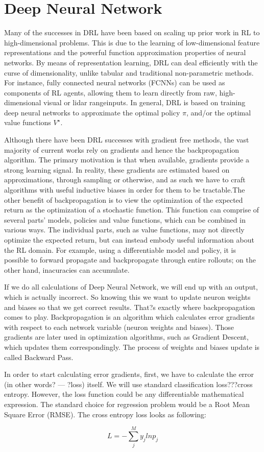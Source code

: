 \section{Deep Neural Network}

Many of the successes in DRL have been based on scaling up prior work in RL to high-dimensional problems. This is due to the learning of low-dimensional feature representations and the powerful function approximation properties of neural networks. By means of representation learning, DRL can deal efficiently with the curse of dimensionality, unlike tabular and traditional non-parametric methods. For instance, fully connected neural networks (FCNNs) can be used as components of RL agents, allowing them to learn directly from raw, high-dimensional visual or lidar rangeinputs. In general, DRL is based on training deep neural networks to approximate the optimal policy $\pi$, and/or the optimal value functions $V^\star$.

Although there have been DRL successes with gradient free methods, the vast majority of current works rely on gradients and hence the backpropagation algorithm. The primary motivation is that when available, gradients provide a strong learning signal. In reality, these gradients are estimated based on approximations, through sampling or otherwise, and as such we have to craft algorithms with useful inductive biases in order for them to be tractable.The other benefit of backpropagation is to view the optimization of the expected return as the optimization of a stochastic function. This function can comprise of several parts' models, policies and value functions, which can be combined in various ways. The individual parts, such as value functions, may not directly optimize the expected return, but can instead embody useful information about the RL domain. For example, using a differentiable model and policy, it is possible to forward propagate and backpropagate through entire rollouts; on the other hand, inacuracies can accumulate.

If we do all calculations of Deep Neural Network, we will end up with an output, which is actually incorrect. So knowing this we want to update neuron weights and biases so that we get correct results. That?s exactly where backpropagation comes to play. Backpropagation is an algorithm which calculates error gradients with respect to each network variable (neuron weights and biases). Those gradients are later used in optimization algorithms, such as Gradient Descent, which updates them correspondingly. The process of weights and biases update is called Backward Pass.

In order to start calculating error gradients, first, we have to calculate the error (in other words? --- ?loss) itself. We will use standard classification loss???cross entropy. However, the loss function could be any differentiable mathematical expression. The standard choice for regression problem would be a Root Mean Square Error (RMSE). The cross entropy loss looks as following:

\begin{equation} \label{eq:reward-func}
L = - \sum_j^M y_j ln p_j
\end{equation}

\vfill
